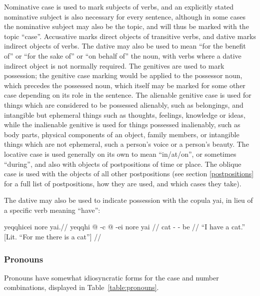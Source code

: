 \documentclass{article}
\begin{document}
Nominative case is used to mark subjects of verbs, and an explicitly stated nominative subject is also necessary for every sentence, although in some cases the nominative subject may also be the topic, and will thus be marked with the topic ``case''. Accusative marks direct objects of transitive verbs, and dative marks indirect objects of verbs. The dative may also be used to mean ``for the benefit of'' or ``for the sake of'' or ``on behalf of'' the noun, with verbs where a dative indirect object is not normally required.  The genitives are used to mark possession; the genitive case marking would be applied to the possessor noun, which precedes the possessed noun, which itself may be marked for some other case depending on its role in the sentence. The alienable genitive case is used for things which are considered to be possessed alienably, such as belongings, and intangible but ephemeral things such as thoughts, feelings, knowledge or ideas, while the inalienable genitive is used for things possessed inalienably, such as body parts, physical components of an object, family members, or intangible things which are not ephemeral, such a person's voice or a person's beauty.  The locative case is used generally on its own to mean ``in/at/on'', or sometimes ``during'', and also with objects of postpositions of time or place.  The oblique case is used with the objects of all other postpositions (see section \ref{postpositions} for a full list of postpositions, how they are used, and which cases they take).

The dative may also be used to indicate possession with the copula {\quch yai}, in lieu of a specific verb meaning ``have'':

\ex[lingstyle=QuCheanya] \begingl
\glpreamble yeqqhicei nore yai.//
\gla yeqqhi @ -c @ -ei nore yai //
\glb cat - -  be //
\glft ``I have a cat.'' [Lit. ``For me there is a cat''] //
\endgl \xe

\subsubsection{Pronouns}

Pronouns have somewhat idiosyncratic forms for the case and number combinations, displayed in Table~\ref{table:pronouns}.
\end{document}
